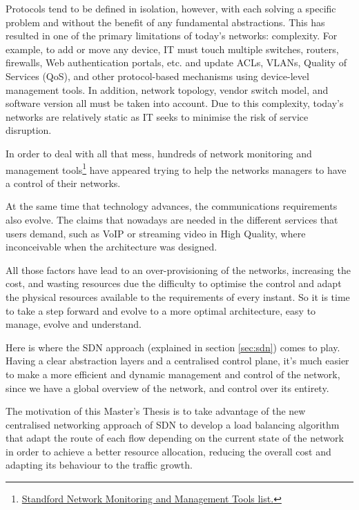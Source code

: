 Protocols tend to be defined in isolation, however, with each solving a specific problem and without the benefit of any fundamental abstractions. This has resulted in one of the primary limitations of today's networks: complexity. For example, to add or move any device, IT must touch multiple switches, routers, firewalls, Web authentication portals, etc. and update ACLs, VLANs, Quality of Services (QoS), and other protocol-based mechanisms using device-level management tools. In addition, network topology, vendor switch model, and software version all must be taken into account. Due to this complexity, today's networks are relatively static as IT seeks to minimise the risk of service disruption.

In order to deal with all that mess, hundreds of network monitoring and management tools\footnote{\href{http://www.slac.stanford.edu/xorg/nmtf/nmtf-tools.html}{Standford Network Monitoring and Management Tools list.}} have appeared trying to help the networks managers to have a control of their networks.

At the same time that technology advances, the communications requirements also evolve. The claims that nowadays are needed in the different services that users demand, such as VoIP or streaming video in High Quality, where inconceivable when the architecture was designed.  

All those factors have lead to an over-provisioning of the networks, increasing the cost, and wasting resources due the difficulty to optimise the control and adapt the physical resources available to the requirements of every instant. So it is time to take a step forward and evolve to a more optimal architecture, easy to manage, evolve and understand.  

Here is where the SDN approach (explained in section \ref{sec:sdn}) comes to play. Having a clear abstraction layers and a centralised control plane, it's much easier to make a more efficient and dynamic management and control of the network, since we have a global overview of the network, and control over its entirety.


The motivation of this Master's Thesis is to take advantage of the new centralised networking approach of SDN to develop a load balancing algorithm that adapt the route of each flow depending on the current state of the network in order to achieve a better resource allocation, reducing the overall cost and adapting its behaviour to the traffic growth.   

